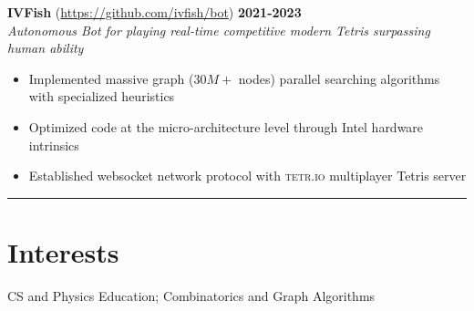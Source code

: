 \documentclass[11pt]{article}
\begin{document}
\textbf{IVFish} (\url{https://github.com/ivfish/bot}) \hfill \textbf{2021-2023} \\
\emph{Autonomous Bot for playing real-time competitive modern Tetris surpassing human ability}
\begin{itemize}
	\cramped
    \item Implemented massive graph ($30M+$ nodes) parallel searching algorithms with specialized heuristics
    \item Optimized code at the micro-architecture level through Intel hardware intrinsics
    \item Established websocket network protocol with \textsc{tetr.io} multiplayer Tetris server
\end{itemize}

\rule{\textwidth}{0.1pt}
\vspace*{-10mm}

\section*{Interests}

\vspace*{-1mm}

CS and Physics Education;
Combinatorics and Graph Algorithms
\end{document}
